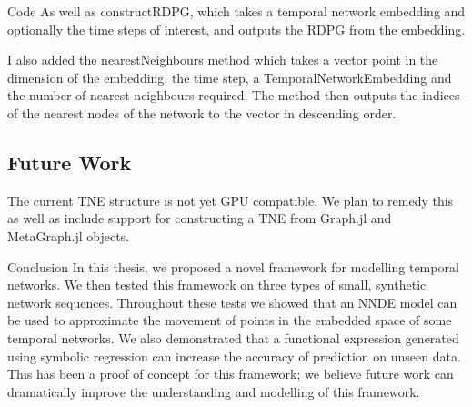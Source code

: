 \documentclass[12pt]{amsart}
\begin{document}
\begin{section}{Code}
        As well as constructRDPG, which takes a temporal network embedding and optionally the time steps of interest, and outputs the RDPG from the embedding.

        I also added the nearestNeighbours method which takes a vector point in the dimension of the embedding, the time step, a TemporalNetworkEmbedding and the number of nearest neighbours required. The method then outputs the indices of the nearest nodes of the network to the vector in descending order.

    \subsection{Future Work}
        The current TNE structure is not yet GPU compatible. We plan to remedy this as well as include support for constructing a TNE from Graph.jl and MetaGraph.jl objects.

\end{section}

\begin{section}{Conclusion}
    In this thesis, we proposed a novel framework for modelling temporal networks. We then tested this framework on three types of small, synthetic network sequences. Throughout these tests we showed that an NNDE model can be used to approximate the movement of points in the embedded space of some temporal networks. We also demonstrated that a functional expression generated using symbolic regression can increase the accuracy of prediction on unseen data. This has been a proof of concept for this framework; we believe future work can dramatically improve the understanding and modelling of this framework.
\end{section} 


\printbibliography
\end{document}
